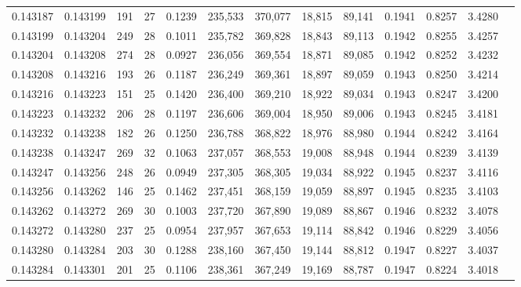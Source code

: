 \begin{tabular}{rrrrrrrrrrrrr}
0.143187 & 0.143199 & 191 &  27 &                                     0.1239 & 235,533 & 370,077 &  18,815 &  89,141 & 0.1941 & 0.8257 & 3.4280 \\
0.143199 & 0.143204 & 249 &  28 &                                     0.1011 & 235,782 & 369,828 &  18,843 &  89,113 & 0.1942 & 0.8255 & 3.4257 \\
0.143204 & 0.143208 & 274 &  28 &                                     0.0927 & 236,056 & 369,554 &  18,871 &  89,085 & 0.1942 & 0.8252 & 3.4232 \\
0.143208 & 0.143216 & 193 &  26 &                                     0.1187 & 236,249 & 369,361 &  18,897 &  89,059 & 0.1943 & 0.8250 & 3.4214 \\
0.143216 & 0.143223 & 151 &  25 &                                     0.1420 & 236,400 & 369,210 &  18,922 &  89,034 & 0.1943 & 0.8247 & 3.4200 \\
0.143223 & 0.143232 & 206 &  28 &                                     0.1197 & 236,606 & 369,004 &  18,950 &  89,006 & 0.1943 & 0.8245 & 3.4181 \\
0.143232 & 0.143238 & 182 &  26 &                                     0.1250 & 236,788 & 368,822 &  18,976 &  88,980 & 0.1944 & 0.8242 & 3.4164 \\
0.143238 & 0.143247 & 269 &  32 &                                     0.1063 & 237,057 & 368,553 &  19,008 &  88,948 & 0.1944 & 0.8239 & 3.4139 \\
0.143247 & 0.143256 & 248 &  26 &                                     0.0949 & 237,305 & 368,305 &  19,034 &  88,922 & 0.1945 & 0.8237 & 3.4116 \\
0.143256 & 0.143262 & 146 &  25 &                                     0.1462 & 237,451 & 368,159 &  19,059 &  88,897 & 0.1945 & 0.8235 & 3.4103 \\
0.143262 & 0.143272 & 269 &  30 &                                     0.1003 & 237,720 & 367,890 &  19,089 &  88,867 & 0.1946 & 0.8232 & 3.4078 \\
0.143272 & 0.143280 & 237 &  25 &                                     0.0954 & 237,957 & 367,653 &  19,114 &  88,842 & 0.1946 & 0.8229 & 3.4056 \\
0.143280 & 0.143284 & 203 &  30 &                                     0.1288 & 238,160 & 367,450 &  19,144 &  88,812 & 0.1947 & 0.8227 & 3.4037 \\
0.143284 & 0.143301 & 201 &  25 &                                     0.1106 & 238,361 & 367,249 &  19,169 &  88,787 & 0.1947 & 0.8224 & 3.4018 \\

\end{tabular}
